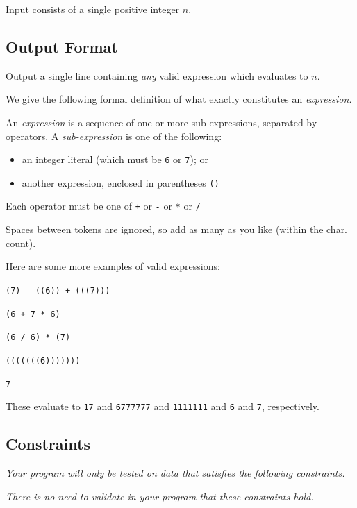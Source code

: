 Input consists of a single positive integer $n$.


\subsection*{Output Format}

Output a single line containing \textit{any} valid expression which evaluates to $n$.

We give the following formal definition of what exactly constitutes an \textit{expression}.

An \textit{expression} is a sequence of one or more sub-expressions, separated by operators.  \newline
A \textit{sub-expression} is one of the following:
\begin{itemize}
\item an integer literal (which must be \texttt{6} or \texttt{7}); or
\item another expression, enclosed in parentheses \texttt{()}
\end{itemize}

Each operator must be one of \texttt{+} or \texttt{-} or \texttt{*} or \texttt{/}

Spaces between tokens are ignored, so add as many as you like (within the char. count).

Here are some more examples of valid expressions:
\begin{center}
    \texttt{(7) - ((6)) + (((7)))}
    
    \texttt{(6 + 7 * 6)}

    \texttt{(6 / 6) * (7)}

    \texttt{(((((((6)))))))}

    \texttt{7}
\end{center}
These evaluate to \texttt{17} and \texttt{6777777} and \texttt{1111111} and \texttt{6} and \texttt{7}, respectively.

\subsection*{Constraints}

\textit{Your program will only be tested on data that satisfies the following constraints.}


\textit{There is no need to validate in your program that these constraints hold.}

